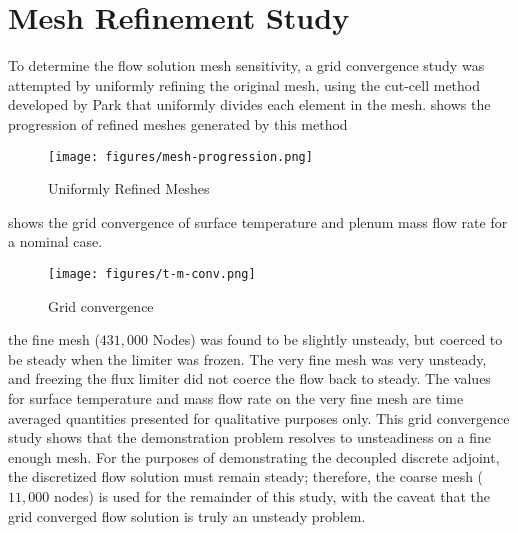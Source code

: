 \section{Mesh Refinement Study}
\label{sec:mesh-refinement-study}

To determine the flow solution mesh sensitivity, a grid convergence study was
attempted by uniformly refining the original mesh, using the cut-cell method
developed by Park\cite{???} that uniformly divides each element in the mesh.
 shows the progression of refined meshes generated by
this method
\begin{figure}[h]
  \centering
  \texttt{[image: figures/mesh-progression.png]}
  \caption{Uniformly Refined Meshes}
  \label{fig:mesh-refined}
\end{figure}
 shows the grid convergence of surface temperature
and plenum mass flow rate for a nominal case.
\begin{figure}[h]
  \centering
  \texttt{[image: figures/t-m-conv.png]}
  \caption{Grid convergence }
  \label{fig:grid-convergence}
\end{figure}
the fine mesh ($431,000$ Nodes) was found to be slightly unsteady, but coerced
to be steady when the limiter was frozen.  The very fine mesh was very unsteady,
and freezing the flux limiter did not coerce the flow back to steady.  The
values for surface temperature and mass flow rate on the very fine mesh are time
averaged quantities presented for qualitative purposes only.  This grid
convergence study shows that the demonstration problem resolves to unsteadiness
on a fine enough mesh.  For the purposes of demonstrating the decoupled
discrete adjoint, the discretized flow solution must remain steady; therefore,
the coarse mesh ($11,000$ nodes) is used for the remainder of this study, with
the caveat that the grid converged flow solution is truly an unsteady problem.

